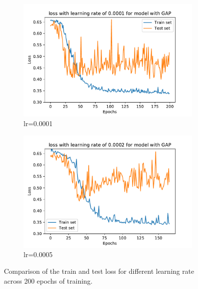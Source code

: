 \begin{figure}
\begin{subfigure}[b]{0.475\textwidth}
        \includegraphics[width=\textwidth]{figures/Experiements/training_3D_CNN_GAP_lr_0.0001.pdf}
        \caption[]%
        {{\small lr=0.0001}}    
    \end{subfigure}
    \quad
    \begin{subfigure}[b]{0.475\textwidth}   
        \centering 
        \includegraphics[width=\textwidth]{figures/Experiements/training_3D_CNN_GAP_lr_0.0002.pdf}
        \caption[]%
        {{\small lr=0.0005}}    
    \end{subfigure}
    \caption[ The average and standard deviation of critical parameters ]
    {\small Comparison of the train and test loss for different learning rate across 200 epochs of training. } 
    \label{fig:fine_tune_learning_rate}
\end{figure}


